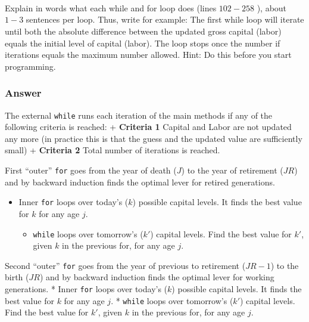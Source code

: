\documentclass[10pt,notitlepage,onecolumn,aps,pra]{revtex4-1}
\providecommand{\tightlist}{%
      \setlength{\itemsep}{0pt}\setlength{\parskip}{0pt}}
\begin{document}
    \hypertarget{qquad}{%
\subsection{\texorpdfstring{\(\qquad\)}{\textbackslash qquad}}\label{qquad}}

Explain in words what each while and for loop does (lines \(102-258\) ),
about \(1-3\) sentences per loop. Thus, write for example: The first
while loop will iterate until both the absolute difference between the
updated gross capital (labor) equals the initial level of capital
(labor). The loop stops once the number if iterations equals the maximum
number allowed. Hint: Do this before you start programming.

    \hypertarget{answer}{%
\subsubsection{Answer}\label{answer}}

The external \texttt{while} runs each iteration of the main methods if
any of the following criteria is reached: + \textbf{Criteria 1} Capital
and Labor are not updated any more (in practice this is that the guess
and the updated value are sufficiently small) + \textbf{Criteria 2}
Total number of iterations is reached.

First ``outer'' \texttt{for} goes from the year of death (\(J\)) to the
year of retirement (\(JR\)) and by backward induction finds the optimal
lever for retired generations.

\begin{itemize}
\tightlist
\item
  Inner \texttt{for} loops over today's (\(k\)) possible capital levels.
  It finds the best value for \(k\) for any age \(j\).

  \begin{itemize}
  \tightlist
  \item
    \texttt{while} loops over tomorrow's (\(k'\)) capital levels. Find
    the best value for \(k'\), given \(k\) in the previous for, for any
    age \(j\).
  \end{itemize}
\end{itemize}

Second ``outer'' \texttt{for} goes from the year of previous to
retirement (\(JR-1\)) to the birth (\(JR\)) and by backward induction
finds the optimal lever for working generations. * Inner \texttt{for}
loops over today's (\(k\)) possible capital levels. It finds the best
value for \(k\) for any age \(j\). * \texttt{while} loops over
tomorrow's (\(k'\)) capital levels. Find the best value for \(k'\),
given \(k\) in the previous for, for any age \(j\).
\end{document}
